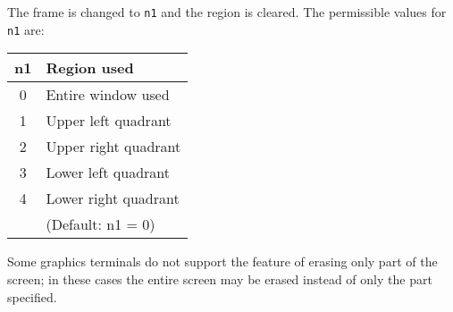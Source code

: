 \headb

The frame is changed to {\tt n1} and the region is cleared.
The permissible values for {\tt n1} are:

\begin{center}
\begin{tabular}{c | l }
 n1  & Region used \\ \hline
  0  & Entire window used \\
  1  & Upper left quadrant \\
  2  & Upper right quadrant \\
  3  & Lower left  quadrant \\
  4  & Lower right quadrant \\
     & (Default: n1 = 0)
\end{tabular}
\end{center}

Some graphics terminals do not support the feature of erasing
only part of the screen; in these cases the entire
screen may be erased instead of only the part specified.
\vfill
\eject
